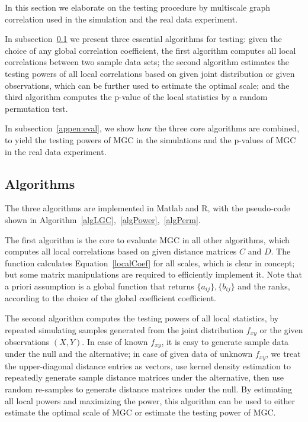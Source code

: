\documentclass[11pt]{article}
\begin{document}
In this section we elaborate on the testing procedure by multiscale graph correlation used in the simulation and the real data experiment. 

In subsection~\ref{appen:algorithms} we present three essential algorithms for testing: given the choice of any global correlation coefficient, the first algorithm computes all local correlations between two sample data sets; the second algorithm estimates the testing powers of all local correlations based on given joint distribution or given observations, which can be further used to estimate the optimal scale; and the third algorithm computes the p-value of the local statistics by a random permutation test. 

In subsection~\ref{appen:eval}, we show how the three core algorithms are combined, to yield the testing powers of MGC in the simulations and the p-values of MGC in the real data experiment.

\subsection{Algorithms}
\label{appen:algorithms}
The three algorithms are implemented in Matlab and R, with the pseudo-code shown in Algorithm~\ref{algLGC},~\ref{algPower},~\ref{algPerm}.

The first algorithm is the core to evaluate MGC in all other algorithms, which computes all local correlations based on given distance matrices $C$ and $D$. The function calculates Equation~\ref{localCoef} for all scales, which is clear in concept; but some matrix manipulations are required to efficiently implement it. Note that a priori assumption is a global function that returns $\{a_{ij}\},\{b_{ij}\}$ and the ranks, according to the choice of the global coefficient coefficient.

The second algorithm computes the testing powers of all local statistics, by repeated simulating samples generated from the joint distribution $f_{xy}$ or the given observations $(X, Y)$. In case of known $f_{xy}$, it is easy to generate sample data under the null and the alternative; in case of given data of unknown $f_{xy}$, we treat the upper-diagonal distance entries as vectors, use kernel density estimation \cite{BotevEtAl2010} to repeatedly generate sample distance matrices under the alternative, then use random re-samples to generate distance matrices under the null. By estimating all local powers and maximizing the power, this algorithm can be used to either estimate the optimal scale of MGC or estimate the testing power of MGC.
\end{document}
